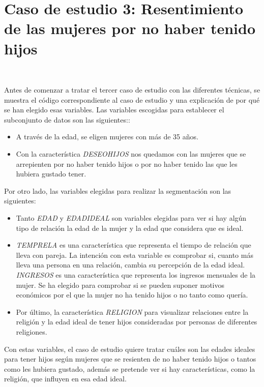 \documentclass[paper=a4, fontsize=12pt]{article} %
\numberwithin{equation}{section} %
\numberwithin{figure}{section} %
\numberwithin{table}{section} %
\begin{document}
\section{Caso de estudio 3: Resentimiento de las mujeres por no haber tenido hijos}
\begin{figure}[H]
    \centering
    \mbox {
    }
\end{figure}

Antes de comenzar a tratar el tercer caso de estudio con las diferentes técnicas, se muestra el código correspondiente al caso de estudio y una explicación de por qué se han elegido esas variables. Las variables escogidas para establecer el subconjunto de datos son las siguientes::
\begin{itemize}
\item A través de la edad, se eligen mujeres con más de 35 años.
\item Con la característica \textit{DESEOHIJOS} nos quedamos con las mujeres que se arrepienten por no haber tenido hijos o por no haber tenido las que les hubiera gustado tener.
\end{itemize}

Por otro lado, las variables elegidas para realizar la segmentación son las siguientes:
\begin{itemize}
\item Tanto \textit{EDAD} y \textit{EDADIDEAL} son variables elegidas para ver si hay algún tipo de relación la edad de la mujer y la edad que considera que es ideal.
\item \textit{TEMPRELA} es una característica que representa el tiempo de relación que lleva con pareja. La intención con esta variable es comprobar si, cuanto más lleva una persona en una relación, cambia su percepción de la edad ideal.
\textit{INGRESOS} es una característica que representa los ingresos mensuales de la mujer. Se ha elegido para comprobar si se pueden suponer motivos económicos por el que la mujer no ha tenido hijos o no tanto como quería.
\item Por último, la característica \textit{RELIGION} para visualizar relaciones entre la religión y la edad ideal de tener hijos consideradas por personas de diferentes religiones.
\end{itemize}

Con estas variables, el caso de estudio quiere tratar cuáles son las edades ideales para tener hijos según mujeres que se resienten de no haber tenido hijos o tantos como les hubiera gustado, además se pretende ver si hay características, como la religión, que influyen en esa edad ideal.\\
\end{document}
